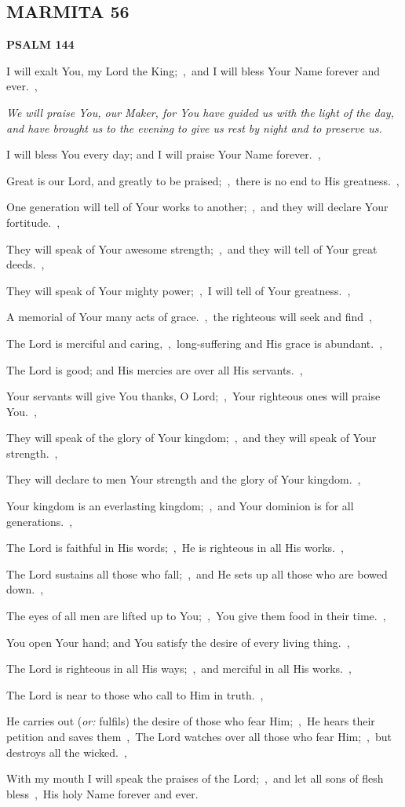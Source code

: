 \documentclass[12pt,twoside,a5paper]{article}
\newcommand{\marmita}[1]{\subsection*{MARMITA {#1}}}
\newcommand{\psalm}[1]{\textbf{PSALM {#1}}\nopagebreak}
\newcommand{\qanona}[1]{{\liturgicalhint{Qanona.} \emph{#1}}}
\newcommand{\translationoption}[1]{\emph{or:} #1}
\begin{document}
\marmita{56}

\psalm{144}

\begin{normalparskip}
  I will exalt You, my Lord the King;~\sep\ and I will bless Your Name forever and ever.~\sep

  \qanona{We will praise You, our Maker, for You have guided us with the light of the day, and have brought us to the evening to give us rest by night and to preserve us.}

  I will bless You every day; and I will praise Your Name forever.~\sep

  Great is our Lord, and greatly to be praised;~\sep\ there is no end to His greatness.~\sep

  One generation will tell of Your works to another;~\sep\ and they will declare Your fortitude.~\sep

  They will speak of Your awesome strength;~\sep\ and they will tell of Your great deeds.~\sep

  They will speak of Your mighty power;~\sep\ I will tell of Your greatness.~\sep

  A memorial of Your many acts of grace.~\sep\ the righteous will seek and find~\sep

  The Lord is merciful and caring,~\sep\ long-suffering and His grace is abundant.~\sep

  The Lord is good; and His mercies are over all His servants.~\sep

  Your servants will give You thanks, O Lord;~\sep\ Your righteous ones will praise You.~\sep

  They will speak of the glory of Your kingdom;~\sep\ and they will speak of Your strength.~\sep

  They will declare to men Your strength and the glory of Your kingdom.~\sep

  Your kingdom is an everlasting kingdom;~\sep\ and Your dominion is for all generations.~\sep

  The Lord is faithful in His words;~\sep\ He is righteous in all His works.~\sep

  The Lord sustains all those who fall;~\sep\ and He sets up all those who are bowed down.~\sep

  The eyes of all men are lifted up to You;~\sep\ You give them food in their time.~\sep

  You open Your hand; and You satisfy the desire of every living thing.~\sep

  The Lord is righteous in all His ways;~\sep\ and merciful in all His works.~\sep

  The Lord is near to those who call to Him in truth.~\sep

  He carries out (\translationoption{fulfils}) the desire of those who fear Him;~\sep\ He hears their petition and saves them~\sep\ The Lord watches over all those who fear Him;~\sep\ but destroys all the wicked.~\sep

  With my mouth I will speak the praises of the Lord;~\sep\ and let all sons of flesh bless~\sep\ His holy Name forever and ever.
\end{normalparskip}
\end{document}
